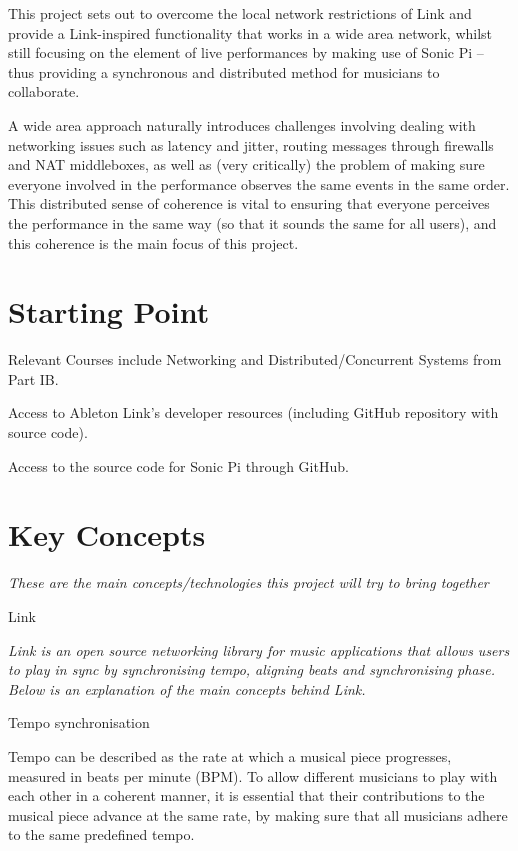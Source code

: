 \documentclass[12pt,a4paper,twoside]{article}
\begin{document}
This project sets out to overcome the local network restrictions of Link and provide a Link-inspired functionality that works in a wide area network, whilst still focusing on the element of live performances by making use of Sonic Pi -- thus providing a synchronous and distributed method for musicians to collaborate.

A wide area approach naturally introduces challenges involving dealing with networking issues such as latency and jitter, routing messages through firewalls and NAT middleboxes, as well as (very critically) the problem of making sure everyone involved in the performance observes the same events in the same order. This distributed sense of coherence is vital to ensuring that everyone perceives the performance in the same way (so that it sounds the same for all users), and this coherence is the main focus of this project.

\section*{Starting Point}


Relevant Courses include Networking and Distributed/Concurrent Systems from Part IB.

Access to Ableton Link's developer resources (including GitHub repository with source code).

Access to the source code for Sonic Pi through GitHub.


\section*{Key Concepts}

\emph{These are the main concepts/technologies this project will try to bring together}

\Large
Link

\normalsize
\emph{Link is an open source networking library for music applications that allows users to play in sync by synchronising tempo, aligning beats and synchronising phase. Below is an explanation of the main concepts behind Link.}

\large
Tempo synchronisation

\normalsize
Tempo can be described as the rate at which a musical piece progresses, measured in beats per minute (BPM). To allow different musicians to play with each other in a coherent manner, it is essential that their contributions to the musical piece advance at the same rate, by making sure that all musicians adhere to the same predefined tempo.
\end{document}
